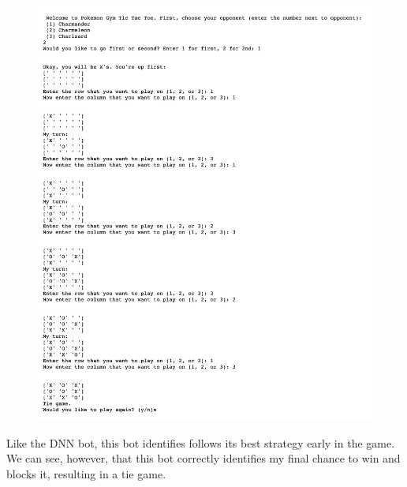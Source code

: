 \begin{figure}[H]
	\centering
	\includegraphics[scale=.3]{h_v_conv}
\end{figure}

Like the DNN bot, this bot identifies follows its best strategy early in the game. We can see, however, that this bot correctly identifies my final chance to win and blocks it, resulting in a tie game. 

